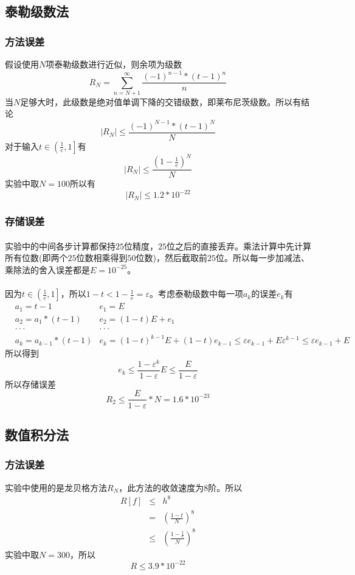 \documentclass[UTF8,twocolum,titlepage]{ctexart}
\begin{document}
\subsection*{泰勒级数法}
\subsubsection*{方法误差}
假设使用$N$项泰勒级数进行近似，则余项为级数$$R_N=\sum\limits_{n=N+1}^{\infty}\frac{\left(-1\right)^{n-1}*\left(t-1\right)^{n}}{n}$$
当$N$足够大时，此级数是绝对值单调下降的交错级数，即莱布尼茨级数。所以有结论$$\left|R_N\right| \le  \frac{\left(-1\right)^{N-1}*\left(t-1\right)^{N}}{N}$$对于输入$t\in\left(\frac{1}{e},1 \right]$有$$\left|R_N\right| \le \frac{\left(1-\frac{1}{e}\right)^N}{N}$$实验中取$N=100$所以有$$\left|R_N\right| \le 1.2*10^{-22}$$
\subsubsection*{存储误差}
\paragraph{}
实验中的中间各步计算都保持$25$位精度，$25$位之后的直接丢弃。乘法计算中先计算所有位数(即两个$25$位数相乘得到$50$位数)，然后截取前$25$位。所以每一步加减法、乘除法的舍入误差都是$E=10^{-25}$。
\paragraph{}
因为$t\in\left(\frac{1}{e},1\right]$，所以$1-t < 1-\frac{1}{e}=\varepsilon$。考虑泰勒级数中每一项$a_k$的误差$e_k$有
\begin{eqnarray*}
&a_1=t-1 &e_1=E\\
&a_2=a_1*(t-1) &e_2=(1-t)E+e_1\\
&\cdot\cdot\cdot&\cdot\cdot\cdot\\
&a_k=a_{k-1}*(t-1) &e_k=(1-t)^{k-1}E+(1-t)e_{k-1} \le \varepsilon e_{k-1}+E\varepsilon^{k-1} \le \varepsilon e_{k-1}+E
\end{eqnarray*}
所以得到$$e_k \le \frac{1-\varepsilon^k}{1-\varepsilon}E \le \frac{E}{1-\varepsilon}$$所以存储误差$$R_2 \le \frac{E}{1-\varepsilon}*N=1.6*10^{-23}$$
\subsection*{数值积分法}
\subsubsection*{方法误差}
实验中使用的是龙贝格方法$R_N$，此方法的收敛速度为8阶。所以
\begin{eqnarray*}
R\left[f\right] &\le& h^8\\&=&\left(\frac{1-t}{N}\right)^8\\ &\le& \left(\frac{1-\frac{1}{e}}{N}\right)^8
\end{eqnarray*}
实验中取$N=300$，所以$$R \le 3.9*10^{-22}$$
\end{document}
